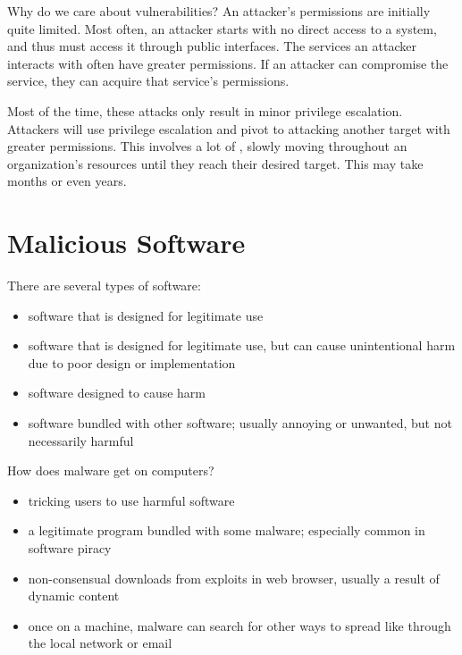 \documentclass[code]{amznotes}
\begin{document}
Why do we care about vulnerabilities? An attacker's permissions are initially quite limited. Most often, an attacker starts with no direct access to a system, and thus must access it through public interfaces. The services an attacker interacts with often have greater permissions. If an attacker can compromise the service, they can acquire that service's permissions.

Most of the time, these attacks only result in minor privilege escalation. Attackers will use privilege escalation and pivot to attacking another target with greater permissions. This involves a lot of , slowly moving throughout an organization's resources until they reach their desired target. This may take months or even years.

\section{Malicious Software}

There are several types of software:
\begin{itemize}[noitemsep]
    \item {} software that is designed for legitimate use
    \item {} software that is designed for legitimate use, but can cause unintentional harm due to poor design or implementation
    \item {} software designed to cause harm
    \item {} software bundled with other software; usually annoying or unwanted, but not necessarily harmful
\end{itemize}

How does malware get on computers?
\begin{itemize}[noitemsep]
    \item {} tricking users to use harmful software
    \item {} a legitimate program bundled with some malware; especially common in software piracy
    \item {} non-consensual downloads from exploits in web browser, usually a result of dynamic content
    \item {} once on a machine, malware can search for other ways to spread like through the local network or email
\end{itemize}
\end{document}
